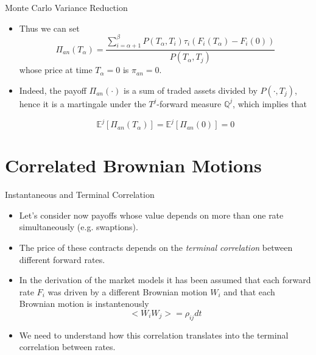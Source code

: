 \documentclass{beamer}
\begin{document}
\begin{frame}{Monte Carlo Variance Reduction}
  \begin{itemize}
  \item<1-> Thus we can set
    \begin{equation*}
      \Pi_{an}(T_\alpha) = \frac{\sum_{i=\alpha+1}^\beta P(T_\alpha,T_i)\tau_i(F_i(T_\alpha) - F_i(0))}{P(T_\alpha,T_j)}
    \end{equation*}
    whose price at time $T_\alpha = 0$ is $\pi_{an} = 0$.
  \item<2-> Indeed, the payoff $\Pi_{an}(\cdot)$ is a sum of traded assets divided by $P(\cdot, T_j)$, hence it is a martingale under the $T^j$-forward measure $\mathbb{Q}^j$, which implies that
    
    \begin{equation*}
      \mathbb{E}^j[\Pi_{an}(T_\alpha)] = \mathbb{E}^j[\Pi_{an}(0)] = 0
    \end{equation*}
  \end{itemize}
\pause
{}
\end{frame}

%

\section{Correlated Brownian Motions}
\begin{frame}{Instantaneous and Terminal Correlation}
\begin{itemize}
\item Let's consider now payoffs whose value depends on more than one rate simultaneously (e.g. swaptions).
\item The price of these contracts depends on the \emph{terminal correlation} between different forward rates.
\item In the derivation of the market models it has been assumed that each forward rate $F_i$ was driven by a different Brownian motion $W_i$ and that each Brownian motion is instantenously 
\begin{equation}
< W_i W_j> = \rho_{ij} dt
\end{equation}
\item We need to understand how this correlation translates into the terminal correlation between rates.
\end{itemize}
\end{frame}
\end{document}
